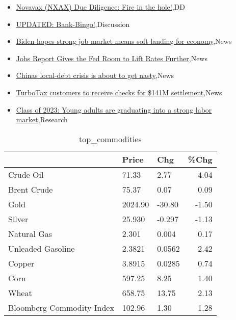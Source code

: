 \documentclass{article}%
\begin{document}
%
\begin{itemize}%
\item%
\href{https://reddit.com/r/wallstreetbets/comments/139lex7/novavax\_nxax\_due\_diligence\_fire\_in\_the\_hole/}{Novavax (NXAX) Due Diligence: Fire in the hole!},DD%
\item%
\href{https://reddit.com/r/StockMarket/comments/1396sre/updated\_bankbingo/}{UPDATED: Bank-Bingo!},Discussion%
\item%
\href{https://reddit.com/r/Economics/comments/139g3hb/biden\_hopes\_strong\_job\_market\_means\_soft\_landing/}{Biden hopes strong job market means soft landing for economy},News%
\item%
\href{https://reddit.com/r/Economics/comments/1396dvm/jobs\_report\_gives\_the\_fed\_room\_to\_lift\_rates/}{Jobs Report Gives the Fed Room to Lift Rates Further},News%
\item%
\href{https://reddit.com/r/Economics/comments/1391x3a/chinas\_localdebt\_crisis\_is\_about\_to\_get\_nasty/}{Chinas local-debt crisis is about to get nasty},News%
\item%
\href{https://reddit.com/r/Economics/comments/138wk03/turbotax\_customers\_to\_receive\_checks\_for\_141m/}{TurboTax customers to receive checks for \$141M settlement},News%
\item%
\href{https://reddit.com/r/Economics/comments/138vph1/class\_of\_2023\_young\_adults\_are\_graduating\_into\_a/}{Class of 2023: Young adults are graduating into a strong labor market},Research%
\end{itemize}%


\begin{table}[htbp]%
\caption{top\_commodities}%
\centering%
\begin{adjustbox}{width=1\textwidth}%
\begin{tabular}{lllr}
\toprule
                          &   Price &    Chg &  \%Chg \\
\midrule
               Crude Oil  &   71.33 &   2.77 &  4.04 \\
             Brent Crude  &   75.37 &   0.07 &  0.09 \\
                    Gold  & 2024.90 & -30.80 & -1.50 \\
                  Silver  &  25.930 & -0.297 & -1.13 \\
             Natural Gas  &   2.301 &  0.004 &  0.17 \\
       Unleaded Gasoline  &  2.3821 & 0.0562 &  2.42 \\
                  Copper  &  3.8915 & 0.0285 &  0.74 \\
                    Corn  &  597.25 &   8.25 &  1.40 \\
                   Wheat  &  658.75 &  13.75 &  2.13 \\
Bloomberg Commodity Index &  102.96 &   1.30 &  1.28 \\
\bottomrule
\end{tabular}
%
\end{adjustbox}%
\end{table}
\end{document}

